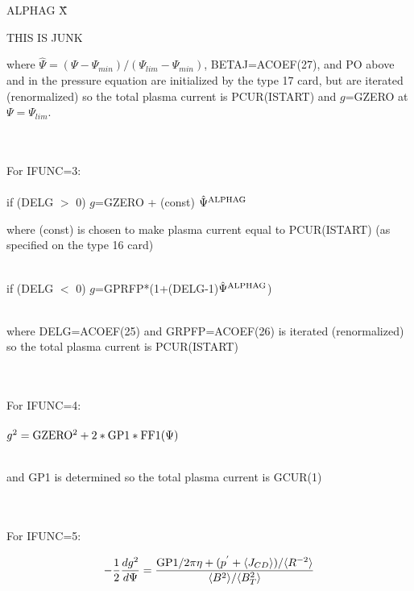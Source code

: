 \begin{tabbing}
ALPHAG \= X\= \parbox[t]{\width}{THIS IS JUNK} \kill
\> \> \parbox[t]{\width}{where $\hat{\Psi} = (\Psi-\Psi_{min})/(\Psi_{lim}-\Psi_{min})$,
BETAJ=ACOEF(27), and PO above and in the pressure equation are initialized by the type 17
card, but are iterated (renormalized) so the total plasma current is PCUR(ISTART) and $g$=GZERO at
$\Psi=\Psi_{lim}$.}\\
 \\
\> \>For IFUNC=3:\\
 \\
\> if (DELG $>$ 0) $g$=GZERO + (const) $\hat{\Psi}^{\rm ALPHAG}$ \\
\> \> \parbox[t]{\width}{where (const) is chosen to make plasma current equal to PCUR(ISTART)
         (as specified on the type 16 card)}\\
\>if (DELG $<$ 0)  $g$=GPRFP*(1+(DELG-1)$\hat{\Psi}^{\rm ALPHAG}$)\\
 \\
\> \> \parbox[t]{\width}{where DELG=ACOEF(25) and GRPFP=ACOEF(26) is iterated
(renormalized) so the total plasma current is PCUR(ISTART)}\\
 \\
\> \> For IFUNC=4:\\
 \\
\> \>$g^2 = \rm GZERO^2 +2*GP1*FF1(\Psi)$\\
 \\
\> \> \parbox[t]{\width}{and GP1 is determined so the total plasma current is GCUR(1)}\\
 \\
\> \>For IFUNC=5:
\end{tabbing}
\begin{displaymath}
-\frac{1}{2} \frac{dg^2}{d\Psi}=\frac{{\rm GP1}/2 \pi \eta +(p^{'}+ \langle J_{CD} \rangle )
/ \langle R^{-2} \rangle}{ \langle B^2 \rangle / \langle B^2_T \rangle}\\
\end{displaymath}
